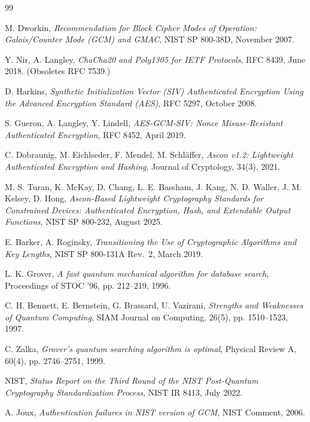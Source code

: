 \documentclass[11pt,a4paper]{article}
\begin{document}

\begin{thebibliography}{99}

  M. Dworkin,
  \emph{Recommendation for Block Cipher Modes of Operation: Galois/Counter Mode (GCM) and GMAC},
  NIST SP 800-38D, November 2007.

  Y. Nir, A. Langley,
  \emph{ChaCha20 and Poly1305 for IETF Protocols},
  RFC 8439, June 2018. (Obsoletes RFC 7539.)

  D. Harkins,
  \emph{Synthetic Initialization Vector (SIV) Authenticated Encryption Using the Advanced Encryption Standard (AES)},
  RFC 5297, October 2008.

  S. Gueron, A. Langley, Y. Lindell,
  \emph{AES-GCM-SIV: Nonce Misuse-Resistant Authenticated Encryption},
  RFC 8452, April 2019.

  C. Dobraunig, M. Eichlseder, F. Mendel, M. Schl\"{a}ffer,
  \emph{Ascon v1.2: Lightweight Authenticated Encryption and Hashing},
  Journal of Cryptology, 34(3), 2021.

  M. S. Turan, K. McKay, D. Chang, L. E. Bassham, J. Kang, N. D. Waller, J. M. Kelsey, D. Hong,
  \emph{Ascon-Based Lightweight Cryptography Standards for Constrained Devices: Authenticated Encryption, Hash, and Extendable Output Functions},
  NIST SP 800-232, August 2025.

  E. Barker, A. Roginsky,
  \emph{Transitioning the Use of Cryptographic Algorithms and Key Lengths},
  NIST SP 800-131A Rev.\ 2, March 2019.

  L. K. Grover,
  \emph{A fast quantum mechanical algorithm for database search},
  Proceedings of STOC '96, pp. 212--219, 1996.

  C. H. Bennett, E. Bernstein, G. Brassard, U. Vazirani,
  \emph{Strengths and Weaknesses of Quantum Computing},
  SIAM Journal on Computing, 26(5), pp. 1510--1523, 1997.

  C. Zalka,
  \emph{Grover's quantum searching algorithm is optimal},
  Physical Review A, 60(4), pp. 2746--2751, 1999.

  NIST,
  \emph{Status Report on the Third Round of the NIST Post-Quantum Cryptography Standardization Process},
  NIST IR 8413, July 2022.

  A. Joux,
  \emph{Authentication failures in NIST version of GCM},
  NIST Comment, 2006.


\end{thebibliography}
\end{document}
